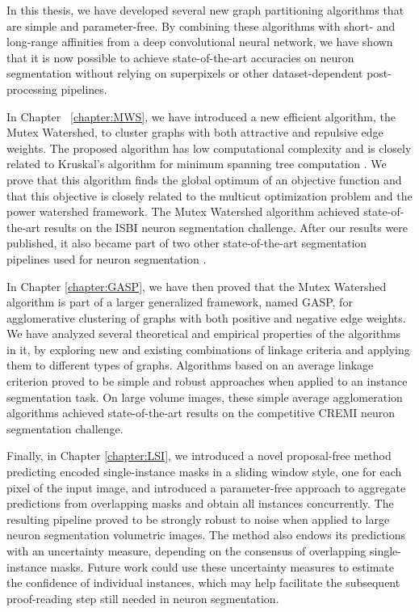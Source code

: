 In this thesis, we have developed several new graph partitioning algorithms that are simple and parameter-free. 
By combining these algorithms with short- and long-range affinities from a deep convolutional neural network, we have shown that it is now possible to achieve state-of-the-art accuracies on neuron segmentation without relying on superpixels or other dataset-dependent post-processing pipelines.

In Chapter ~\ref{chapter:MWS}, we have introduced a new efficient algorithm, the Mutex Watershed, to cluster graphs with both attractive and repulsive edge weights. The proposed algorithm has low computational complexity and is closely related to Kruskal's algorithm for minimum spanning tree computation \cite{kruskal1956shortest}.
We prove that this algorithm finds the global optimum of an objective function and that this objective is closely related to the multicut optimization problem and the power watershed framework.
The Mutex Watershed algorithm achieved state-of-the-art results on the ISBI neuron segmentation challenge. After our results were published, it also became part of two other state-of-the-art segmentation pipelines used for neuron segmentation \cite{hirsch2020patchperpix,lee2019learning}.

In Chapter \ref{chapter:GASP}, we have then proved that the Mutex Watershed algorithm is part of a larger generalized framework, named GASP, for agglomerative clustering of graphs with both positive and negative edge weights. We have analyzed several theoretical and empirical properties of the algorithms in it, by exploring new and existing combinations of linkage criteria and applying them to different types of graphs. Algorithms based on an average linkage criterion proved to be simple and robust approaches when applied to an instance segmentation task. On large volume images, these simple average agglomeration algorithms achieved state-of-the-art results on the competitive CREMI neuron segmentation challenge. 

Finally, in Chapter \ref{chapter:LSI}, we introduced a novel proposal-free method predicting encoded single-instance masks in a sliding window style, one for each pixel of the input image, and introduced a parameter-free approach to aggregate predictions from overlapping masks and obtain all instances concurrently. The resulting pipeline proved to be strongly robust to noise when applied to large neuron segmentation volumetric images. 
The method also endows its predictions with an uncertainty measure, depending on the consensus of overlapping single-instance masks. Future work could use these uncertainty measures to estimate the confidence of individual instances, which may help facilitate the subsequent proof-reading step still needed in neuron segmentation.

